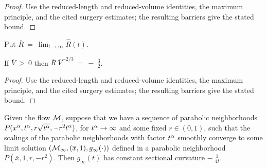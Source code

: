 \begin{proof}
\sketch Use the reduced-length and reduced-volume identities, the maximum principle, and the cited surgery estimates; the resulting barriers give the stated bound.
\end{proof}

Put $\overline{R} \: = \: \lim_{t \rightarrow \infty} \hat{R}(t)$.

\begin{lemma}
  \label{lem:kl-noncollapsed-pointed-limits-hyperbolic-noncollapsing-lemma-5}
 \label{RVlemma}
If $\overline{V} \: > \: 0$ then
$\overline{R} \: \overline{V}^{-2/3} \: = \: - \: \frac32$.
\end{lemma}

\begin{proof}
\sketch Use the reduced-length and reduced-volume identities, the maximum principle, and the cited surgery estimates; the resulting barriers give the stated bound.
\end{proof}

\begin{proposition}
  \label{prop:kl-noncollapsed-pointed-limits-hyperbolic-convergence-noncollapsing}
 \label{propII.7.1}
Given the flow ${\mathcal M}$,
suppose that we have a sequence of parabolic neighborhoods
$P(x^\alpha, t^\alpha, r \sqrt{t^\alpha}, - r^2 t^\alpha)$, for
$t^\alpha \rightarrow \infty$ and some fixed $r \in (0,1)$, such that
the scalings of the parabolic neighborhoods with factor
$t^\alpha$ smoothly converge to some limit
solution $({\mathcal M}_\infty, (\overline{x}, 1), g_\infty(\cdot))$
defined in a parabolic neighborhood
$P(\overline{x}, 1, r, -r^2)$. Then $g_\infty(t)$ has
constant sectional curvature $- \: \frac{1}{4t}$.
\end{proposition}

